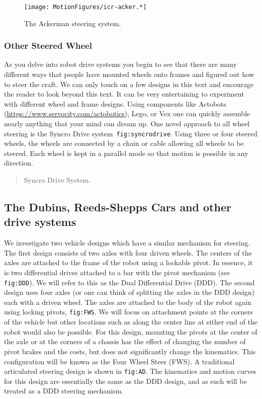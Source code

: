 \begin{figure}
\centering
\texttt{[image: MotionFigures/icr-acker.*]}
\caption{The Ackerman steering system.}
\end{figure}

\hypertarget{other-steered-wheel}{%
\subsubsection{Other Steered Wheel}\label{other-steered-wheel}}

As you delve into robot drive systems you begin to see that there are
many different ways that people have mounted wheels onto frames and
figured out how to steer the craft. We can only touch on a few designs
in this text and encourage the reader to look beyond this text. It can
be very entertaining to experiment with different wheel and frame
designs. Using components like Actobots
(\url{https://www.servocity.com/actobotics}), Lego, or Vex one can
quickly assemble nearly anything that your mind can dream up. One novel
approach to all wheel steering is the Syncro Drive
system~\texttt{fig:syncrodrive}. Using three or four steered wheels, the
wheels are connected by a chain or cable allowing all wheels to be
steered. Each wheel is kept in a parallel mode so that motion is
possible in any direction.

\begin{quote}
Syncro Drive System.
\end{quote}

\hypertarget{the-dubins-reeds-shepps-cars-and-other-drive-systems}{%
\subsection{The Dubins, Reeds-Shepps Cars and other drive
systems}\label{the-dubins-reeds-shepps-cars-and-other-drive-systems}}

We investigate two vehicle designs which have a similar mechanism for
steering. The first design consists of two axles with four driven
wheels. The centers of the axles are attached to the frame of the robot
using a lockable pivot. In essence, it is two differential drives
attached to a bar with the pivot mechanism (see \texttt{fig:DDD}). We
will refer to this as the Dual Differential Drive (DDD). The second
design uses four axles (or one can think of splitting the axles in the
DDD design) each with a driven wheel. The axles are attached to the body
of the robot again using locking pivots, \texttt{fig:FWS}. We will focus
on attachment points at the corners of the vehicle but other locations
such as along the center line at either end of the robot would also be
possible. For this design, mounting the pivots at the center of the axle
or at the corners of a chassis has the effect of changing the number of
pivot brakes and the costs, but does not significantly change the
kinematics. This configuration will be known as the Four Wheel Steer
(FWS). A traditional articulated steering design is shown in
\texttt{fig:AD}. The kinematics and motion curves for this design are
essentially the same as the DDD design, and as such will be treated as a
DDD steering mechanism.

